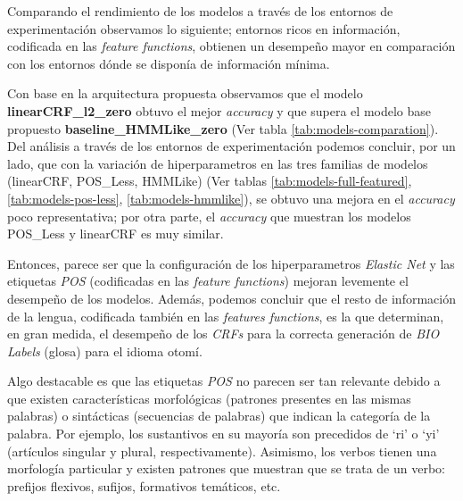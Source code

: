\documentclass[letterpaper,12pt,oneside]{book}
\theoremstyle{definition}
\begin{document}
Comparando el rendimiento de los modelos a través de los entornos de experimentación observamos lo siguiente; entornos ricos en información, codificada en las \textit{feature functions}, obtienen un desempeño mayor en comparación con los entornos dónde se disponía de información mínima.

Con base en la arquitectura propuesta observamos que el modelo  \textbf{\textsf{linearCRF\_l2\_zero}} obtuvo el mejor \textit{accuracy} y que supera el modelo base propuesto \textbf{\textsf{baseline\_HMMLike\_zero}} (Ver tabla \ref{tab:models-comparation}). Del análisis a través de los entornos de experimentación podemos concluir, por un lado, que con la variación de hiperparametros en las tres familias de modelos (\textsf{linearCRF}, \textsf{POS\_Less}, \textsf{HMMLike}) (Ver tablas \ref{tab:models-full-featured}, \ref{tab:models-pos-less}, \ref{tab:models-hmmlike}), se obtuvo una mejora en el \textit{accuracy} poco representativa; por otra parte, el \textit{accuracy} que muestran los modelos \textsf{POS\_Less} y \textsf{linearCRF} es muy similar.

Entonces, parece ser que la configuración de los hiperparametros \textit{Elastic Net} y las etiquetas \textit{POS} (codificadas en las \textit{feature functions}) mejoran levemente el desempeño de los modelos. Además, podemos concluir que el resto de información de la lengua, codificada también en las \textit{features functions}, es la que determinan, en gran medida, el desempeño de los \textit{CRFs} para la correcta generación de \textit{BIO Labels} (glosa) para el idioma otomí.

Algo destacable es que las etiquetas \textit{POS} no parecen ser tan relevante debido a que existen características morfológicas (patrones presentes en las mismas palabras) o sintácticas (secuencias de palabras) que indican la categoría de la palabra. Por ejemplo, los sustantivos en su mayoría son precedidos de `ri' o `yi' (artículos singular y plural, respectivamente). Asimismo, los verbos tienen una morfología particular y existen patrones que muestran que se trata de un verbo: prefijos flexivos, sufijos, formativos temáticos, etc.
\end{document}
